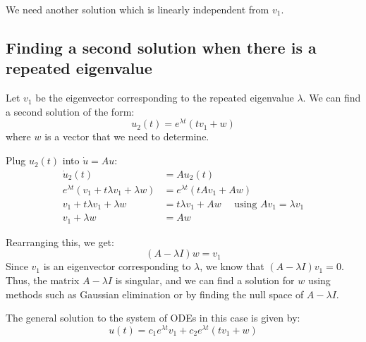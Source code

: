 We need another solution which is linearly independent from $v_1$.

\begin{mdframed}
\subsection{Finding a second solution when there is a repeated eigenvalue}
Let $v_1$ be the eigenvector corresponding to the repeated eigenvalue $\lambda$. We can find a second solution of the form:
\begin{equation*}
u_2(t) = e^{\lambda t} (t v_1 + w)
\end{equation*}
where $w$ is a vector that we need to determine.

Plug $u_2 (t)$ into $\dot{u} = Au$:
\begin{align*}
\dot{u}_2(t) &= A u_2(t) \\
e^{\lambda t} (v_1 + t \lambda v_1 + \lambda w) &= e^{\lambda t} (t A v_1 + A w) \\
v_1 + t \lambda v_1 + \lambda w &= t \lambda v_1 + A w \quad \text{ using } Av_1 = \lambda v_1\\ 
v_1 + \lambda w &= A w
\end{align*}


Rearranging this, we get:
\begin{equation*}
(A - \lambda I) w = v_1
\end{equation*}
Since $v_1$ is an eigenvector corresponding to $\lambda$, we know that $(A - \lambda I) v_1 = 0$. Thus, the matrix $A - \lambda I$ is singular, and we can find a solution for $w$ using methods such as Gaussian elimination or by finding the null space of $A - \lambda I$.
\end{mdframed}

The general solution to the system of ODEs in this case is given by:
\begin{equation*}
\boxed{
u(t) = c_1 e^{\lambda t} v_1 + c_2 e^{\lambda t} (t v_1 + w)
}
\end{equation*}


